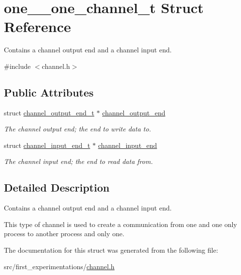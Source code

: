 \hypertarget{structone__2__one__channel__t}{\section{one\-\_\-\_\-one\-\_\-channel\-\_\-t Struct Reference}
\label{structone__2__one__channel__t}
}


Contains a channel output end and a channel input end.  




{\ttfamily \#include $<$channel.\-h$>$}

\subsection*{Public Attributes}
\begin{DoxyCompactItemize}
\item 
\hypertarget{structone__2__one__channel__t_a5d987d14f7b8a8b975c128c0a8d78a63}{struct \hyperlink{structchannel__output__end__t}{channel\-\_\-output\-\_\-end\-\_\-t} $\ast$ \hyperlink{structone__2__one__channel__t_a5d987d14f7b8a8b975c128c0a8d78a63}{channel\-\_\-output\-\_\-end}}\label{structone__2__one__channel__t_a5d987d14f7b8a8b975c128c0a8d78a63}

\begin{DoxyCompactList}\small\item\em The channel output end; the end to write data to. \end{DoxyCompactList}\item 
\hypertarget{structone__2__one__channel__t_aa6fa9e783fe71b03be9586bf19521096}{struct \hyperlink{structchannel__input__end__t}{channel\-\_\-input\-\_\-end\-\_\-t} $\ast$ \hyperlink{structone__2__one__channel__t_aa6fa9e783fe71b03be9586bf19521096}{channel\-\_\-input\-\_\-end}}\label{structone__2__one__channel__t_aa6fa9e783fe71b03be9586bf19521096}

\begin{DoxyCompactList}\small\item\em The channel input end; the end to read data from. \end{DoxyCompactList}\end{DoxyCompactItemize}


\subsection{Detailed Description}
Contains a channel output end and a channel input end. 

This type of channel is used to create a communication from one and one only process to another process and only one. 

The documentation for this struct was generated from the following file\-:\begin{DoxyCompactItemize}
\item 
src/first\-\_\-experimentations/\hyperlink{channel_8h}{channel.\-h}\end{DoxyCompactItemize}
